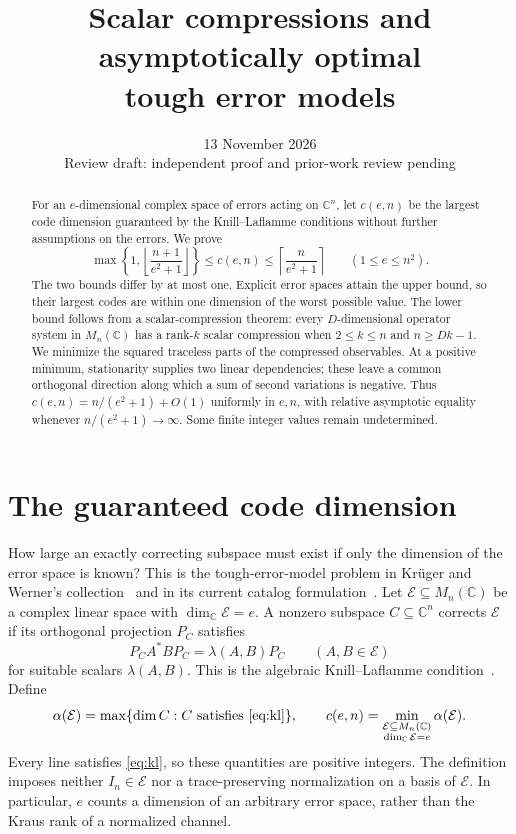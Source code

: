 \documentclass[11pt]{article}
\title{Scalar compressions and asymptotically optimal\protect\\ tough error models}
\author{}
\date{13 November 2026\\[4pt]
  \small Review draft: independent proof and prior-work review pending}
\newcommand{\C}{\mathbb C}
\newcommand{\E}{\mathcal E}
\theoremstyle{remark}
\numberwithin{equation}{section}
\begin{document}
\maketitle
\begin{abstract}
For an $e$-dimensional complex space of errors acting on $\C^n$, let
$c(e,n)$ be the largest code dimension guaranteed by the Knill--Laflamme
conditions without further assumptions on the errors. We prove
\[
 \max\!\left\{1,\left\lfloor\frac{n+1}{e^2+1}\right\rfloor\right\}
 \le c(e,n)\le
 \left\lceil\frac{n}{e^2+1}\right\rceil
 \qquad (1\le e\le n^2).
\]
The two bounds differ by at most one. Explicit error spaces attain the
upper bound, so their largest codes are within one dimension of the
worst possible value. The lower bound follows from a scalar-compression
theorem: every $D$-dimensional operator system in $M_n(\C)$ has a rank-$k$
scalar compression when $2\le k\le n$ and $n\ge Dk-1$.
We minimize the squared traceless parts of the compressed observables.
At a positive minimum, stationarity supplies two linear dependencies;
these leave a common orthogonal direction along which a sum of second
variations is negative. Thus $c(e,n)=n/(e^2+1)+O(1)$ uniformly in $e,n$,
with relative asymptotic equality whenever $n/(e^2+1)\to\infty$.
Some finite integer values remain undetermined.
\end{abstract}

\section{The guaranteed code dimension}

How large an exactly correcting subspace must exist if only the dimension
of the error space is known? This is the tough-error-model problem in
Kr\"uger and Werner's collection~\cite[Problem~14]{KW05} and in its
current catalog formulation~\cite{QIQC}.
Let $\E\subseteq M_n(\C)$ be a complex linear space with
$\dim_{\C}\E=e$. A nonzero subspace $C\subseteq\C^n$ corrects $\E$ if
its orthogonal projection $P_C$ satisfies
\begin{equation}\label{eq:kl}
 P_C A^*B P_C=\lambda(A,B)P_C\qquad(A,B\in\E)
\end{equation}
for suitable scalars $\lambda(A,B)$. This is the algebraic
Knill--Laflamme condition~\cite{KL97,KLV00}. Define
\begin{equation}\label{eq:minimax}
 \alpha(\E)=\max\{\dim C:C\text{ satisfies \eqref{eq:kl}}\},
 \qquad
 c(e,n)=\min_{\substack{\E\subseteq M_n(\C)\\\dim_{\C}\E=e}}
 \alpha(\E).
\end{equation}
Every line satisfies \eqref{eq:kl}, so these quantities are positive
integers. The definition imposes neither $I_n\in\E$ nor a
trace-preserving normalization on a basis of $\E$. In particular, $e$
counts a dimension of an arbitrary error space, rather than the Kraus
rank of a normalized channel.
\end{document}
